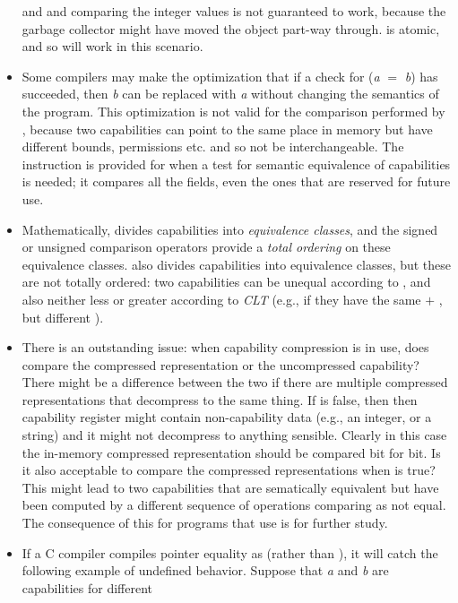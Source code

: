\begin{itemize}
 and  and comparing the
integer values is not guaranteed to work, because the garbage collector
might have moved the object part-way through.  is
atomic, and so will work in this scenario.
\item
Some compilers may make the optimization that if a check for (\emph{a} $=$
\emph{b}) has succeeded, then \emph{b} can be replaced with \emph{a} without
changing the semantics of the program. This optimization is not valid
for the comparison performed by , because two capabilities
can point to the same place in memory but have different bounds, permissions
etc. and so not be interchangeable. The  instruction is
provided for when a test for semantic equivalence of capabilities is
needed; it compares all the fields, even the ones that are reserved for
future use.
\item
Mathematically,  divides capabilities into
\emph{equivalence classes}, and the signed or unsigned comparison operators
provide a \emph{total ordering} on these equivalence classes.
 also divides capabilities into equivalence classes,
but these are not totally ordered: two capabilities can be unequal according
to , and also neither less or greater according to
\emph{CLT} (e.g., if they have the same \cbase{} $+$ \coffset{}, but different
\clength{}).
\item
There is an outstanding issue: when capability compression is in use, does
 compare the compressed representation or the uncompressed
capability? There might be a difference between the two if there are multiple
compressed representations that decompress to the same thing. If
\ctag{} is false, then then capability register might contain non-capability
data (e.g., an integer, or a string) and it might not decompress to anything
sensible. Clearly in this case the in-memory compressed representation should
be compared bit for bit. Is it also acceptable to compare the compressed
representations when \ctag{} is true? This might lead to two capabilities that
are sematically equivalent but have been computed by a different sequence
of operations comparing as not equal. The consequence of this for programs
that use  is for further study.
\item
If a C compiler compiles pointer equality as  (rather than
), it will catch the following example of undefined
behavior. Suppose that \emph{a} and \emph{b} are capabilities for different

\end{itemize}
